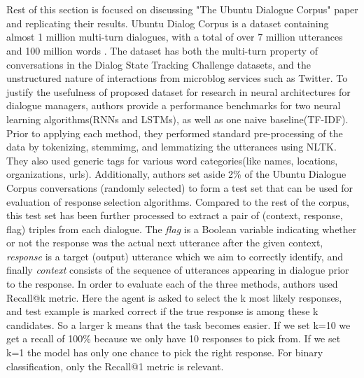 \documentclass[letterpaper] {article} %
\begin{document}
\\\\
Rest of this section is focused on discussing "The Ubuntu Dialogue Corpus" paper and replicating their results. Ubuntu Dialog Corpus is a dataset containing almost 1 million multi-turn dialogues, with a total of over 7 million utterances and 100 million words \cite{lowe2015ubuntu}. The dataset has both the multi-turn property of conversations in the Dialog State Tracking Challenge datasets, and the unstructured nature of interactions from microblog services such as Twitter. To justify the usefulness of proposed dataset for research in neural architectures for dialogue managers, authors provide a performance benchmarks for two neural learning algorithms(RNNs and LSTMs), as well as one naive baseline(TF-IDF). Prior to applying each method, they performed standard pre-processing of the data by tokenizing, stemmimg, and lemmatizing the utterances using NLTK. They also used generic tags for various word categories(like names, locations, organizations, urls). Additionally, authors set aside 2\% of the Ubuntu Dialogue Corpus conversations (randomly selected) to form a test set that can be used for evaluation of response selection algorithms. Compared to the rest of the corpus, this test set has been further processed to extract a pair of (context, response, flag) triples from each dialogue. The \textit{flag} is a Boolean variable indicating whether or not the response was the actual next utterance after the given context, \textit{response} is a target (output) utterance which we aim to correctly identify, and finally \textit{context} consists of the sequence of utterances appearing in dialogue prior to the response. In order to evaluate each of the three methods, authors used Recall@k metric. Here the agent is asked to select the k most likely responses, and test example is marked correct if the true response is among these k candidates. So a larger k means that the task becomes easier. If we set k=10 we get a recall of 100\% because we only have 10 responses to pick from. If we set k=1 the model has only one chance to pick the right response. For binary classification, only the Recall@1 metric is relevant. 
\end{document}
